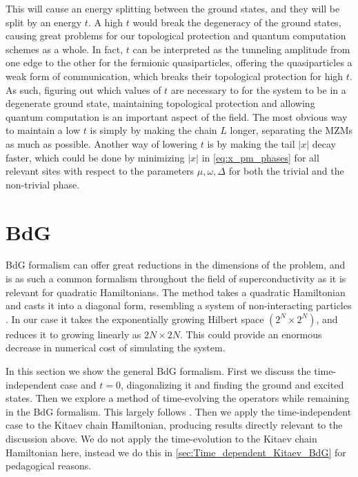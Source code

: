 This will cause an energy splitting between the ground states, and they will be split by an energy $t$. A high $t$ would break the degeneracy of the ground states, causing great problems for our topological protection and quantum computation schemes as a whole. In fact, $t$ can be interpreted as the tunneling amplitude from one edge to the other for the fermionic quasiparticles, offering the quasiparticles a weak form of communication, which breaks their topological protection for high $t$. As such, figuring out which values of $t$ are necessary to for the system to be in a degenerate ground state, maintaining topological protection and allowing quantum computation is an important aspect of the field. The most obvious way to maintain a low $t$ is simply by making the chain $L$ longer, separating the MZMs as much as possible. Another way of lowering $t$ is by making the tail $|x|$ decay faster, which could be done by minimizing $|x|$ in \ref{eq:x_pm_phases} for all relevant sites with respect to the parameters $\mu, \omega, \Delta$ for both the trivial and the non-trivial phase. 

\section{BdG} \label{sec:BdG}
BdG formalism can offer great reductions in the dimensions of the problem, and is as such a common formalism throughout the field of superconductivity as it is relevant for quadratic Hamiltonians. The method takes a quadratic Hamiltonian and casts it into a diagonal form, resembling a system of non-interacting particles \cite{bonarettiBogoliubovValatinTransformationFermionic2026}. In our case it takes the exponentially growing Hilbert space $(2^N \times 2^N)$, and reduces it to growing linearly as $2N \times 2N$. This could provide an enormous decrease in numerical cost of simulating the system.

In this section we show the general BdG formalism. First we discuss the time-independent case and $t = 0$, diagonalizing it and finding the ground and excited states. Then we explore a method of time-evolving the operators while remaining in the BdG formalism. This largely follows \cite{mascotManyBodyMajoranaBraiding2023a}. Then we apply the time-independent case to the Kitaev chain Hamiltonian, producing results directly relevant to the discussion above. We do not apply the time-evolution to the Kitaev chain Hamiltonian here, instead we do this in \ref{sec:Time_dependent_Kitaev_BdG} for pedagogical reasons.

